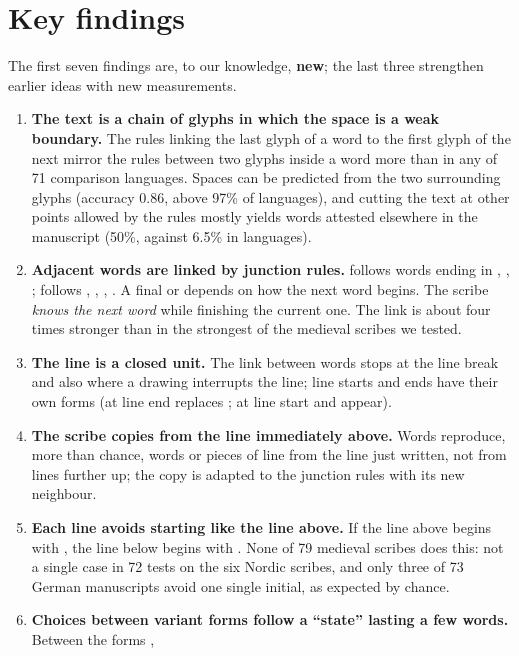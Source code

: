 \section*{Key findings}

The first seven findings are, to our knowledge, \textbf{new}; the last three strengthen earlier ideas with new
measurements.

\begin{enumerate}[label=\textbf{\arabic*.}]
\item \textbf{The text is a chain of glyphs in which the space is a weak boundary.} The rules linking the last glyph of
  a word to the first glyph of the next mirror the rules between two glyphs inside a word more than in any of 71
  comparison languages. Spaces can be predicted from the two surrounding glyphs (accuracy 0.86, above 97\% of
  languages), and cutting the text at other points allowed by the rules mostly yields words attested elsewhere in the
  manuscript (50\%, against 6.5\% in languages).
\item \textbf{Adjacent words are linked by junction rules.}  follows words ending in , ,
  ;  follows , , , . A final  or  depends on how the
  next word begins. The scribe \emph{knows the next word} while finishing the current one. The link is about four
  times stronger than in the strongest of the medieval scribes we tested.
\item \textbf{The line is a closed unit.} The link between words stops at the line break and also where a drawing
  interrupts the line; line starts and ends have their own forms (at line end  replaces ; at line start
   and  appear).
\item \textbf{The scribe copies from the line immediately above.} Words reproduce, more than chance, words or pieces of
  line from the line just written, not from lines further up; the copy is adapted to the junction rules with its new
  neighbour.
\item \textbf{Each line avoids starting like the line above.} If the line above begins with , the line below
  begins with . None of 79 medieval scribes does this: not a single case in 72 tests on the six Nordic scribes,
  and only three of 73 German manuscripts avoid one single initial, as expected by chance.
\item \textbf{Choices between variant forms follow a ``state'' lasting a few words.} Between the forms ,

\end{enumerate}
